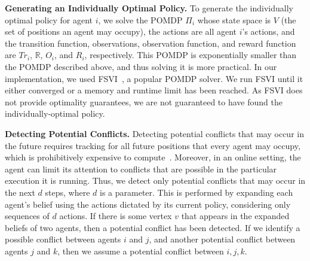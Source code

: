 \documentclass[letterpaper]{article} %
\begin{document}
\noindent\textbf{Generating an Individually Optimal Policy.} 
To generate the individually optimal policy for agent $i$, we solve 
the POMDP $\Pi_i$ whose state space is $V$ (the set of positions an agent may occupy), the actions are all agent $i$'s actions, 
and the transition function, observations, observation function, and reward function are $Tr_i$, $\mathbb{R}$, $O_i$, and $R_i$, respectively. 
This POMDP is exponentially smaller than the POMDP described above, and thus solving it is more practical. 
In our implementation, we used FSVI~\cite{shani2007forward}, a popular POMDP solver.
We run FSVI until it either converged or a memory and runtime limit has been reached. 
As FSVI does not provide optimality guarantees, we are not guaranteed to have found the individually-optimal policy.  





\noindent\textbf{Detecting Potential Conflicts.} 
Detecting potential conflicts that may occur in the future requires tracking for all future positions that every agent may occupy, which is prohibitively expensive to compute~\cite{atzmon2020probabilistic}. Moreover, in an online setting, the agent can limit its attention to conflicts that are possible in the particular execution it is running. 
Thus, we detect only potential conflicts that may occur in the next $d$ steps, where $d$ is a parameter. 
This is performed by expanding each agent's belief using the actions dictated by its current policy, considering only sequences of $d$ actions. 
If there is some vertex $v$ that appears in the expanded beliefs of two agents, then a potential conflict has been detected. 
If we identify a possible conflict between agents $i$ and $j$, and another potential conflict between agents $j$ and $k$, then we assume a potential conflict between $i,j,k$.
\end{document}

